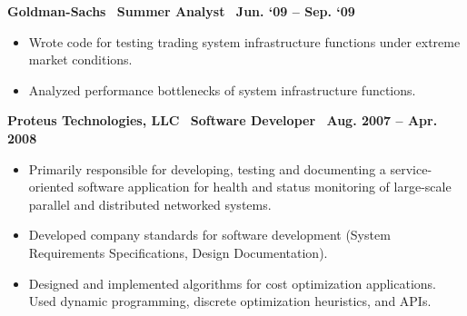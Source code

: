 \textbf{Goldman-Sachs$\>\>\>\>$Summer Analyst$\>\>\>\>$Jun. ‘09 – Sep. ‘09}
\vspace*{-0.0in}
\begin{itemize}
\item Wrote code for testing trading system infrastructure functions under extreme market conditions.
\item Analyzed performance bottlenecks of system infrastructure functions.
\end{itemize}

\textbf{Proteus Technologies, LLC$\>\>\>\>$Software Developer$\>\>\>\>$Aug. 2007 – Apr. 2008}
\vspace*{-0.0in}
\begin{itemize} 
\item Primarily responsible for developing, testing and documenting a service-oriented software application for health and status monitoring  of large-scale parallel and distributed networked systems.
\item Developed company standards for software development (System Requirements Specifications, Design Documentation).
\item Designed and implemented algorithms for cost optimization applications. Used dynamic programming, discrete optimization heuristics, and APIs.
\end{itemize}

